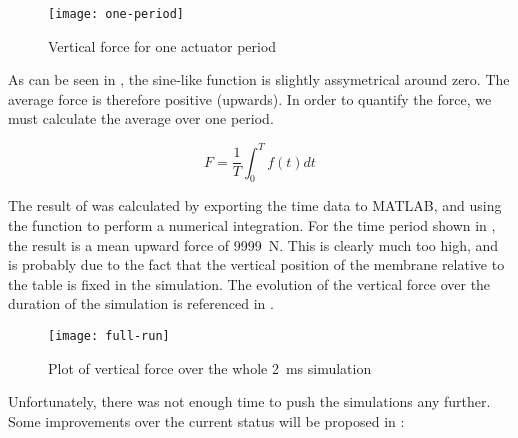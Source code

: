 \begin{figure}[h]
  \begin{center}
    \texttt{[image: one-period]}
  \end{center}
  \caption{Vertical force for one actuator period}
  \label{fig:one-period}
\end{figure}

As can be seen in , the sine-like function is slightly
assymetrical around zero. The average force is therefore positive (upwards).
In order to quantify the force, we must calculate the average over one period. 

\begin{equation}
  F = \frac{1}{T} \int_{0}^{T} f(t) dt
  \label{eq:force}
\end{equation}

The result of  was calculated by exporting the time data to MATLAB,
and using the  function to perform a numerical integration. For the
time period shown in , the result is a mean upward force of
\SI{9999}{\newton}.  %
This is clearly much too high, and is probably due to the fact that the vertical
position of the membrane relative to the table is fixed in the simulation. The
evolution of the vertical force over the duration of the simulation is
referenced in .

\begin{figure}[h]
  \begin{center}
    \texttt{[image: full-run]}
  \end{center}
  \caption{Plot of vertical force over the whole \SI{2}{\milli\second}
  simulation}
  \label{fig:full-run}
\end{figure}

Unfortunately, there was not enough time to push the simulations any further.
Some improvements over the current status will be proposed in
 : 
